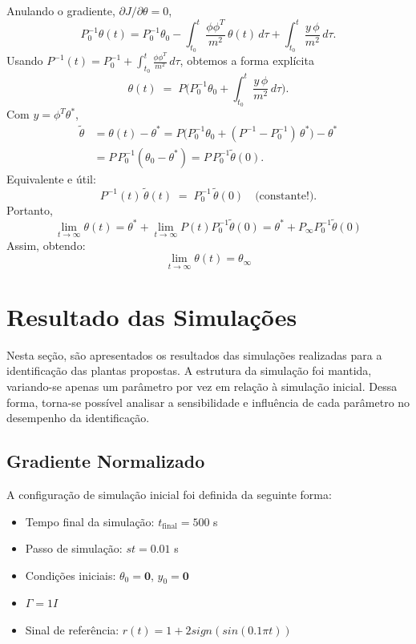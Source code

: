 \documentclass[10pt]{article}
\begin{document}
Anulando o gradiente, \(\partial J/\partial\theta=0\),
\[
P_0^{-1}\theta(t)
= P_0^{-1}\theta_0
- \int_{t_0}^{t}\!\frac{\phi\phi^T}{m^2}\,\theta(t)\,d\tau
+ \int_{t_0}^{t}\!\frac{y\,\phi}{m^2}\,d\tau.
\]
Usando
\(
P^{-1}(t)=P_0^{-1}+\int_{t_0}^t \frac{\phi\phi^T}{m^2}\,d\tau
\),
obtemos a forma explícita
\[
\theta(t) \;=\; P\Big(P_0^{-1}\theta_0
+ \int_{t_0}^{t}\!\frac{y\,\phi}{m^2}\,d\tau\Big).
\]
Com \(y=\phi^T\theta^\ast\),
\begin{align*}
\tilde\theta
&= \theta(t)-\theta^\ast
= P\Big(P_0^{-1}\theta_0 + (P^{-1}-P_0^{-1})\,\theta^\ast\Big) - \theta^\ast\\
&= P\,P_0^{-1}(\theta_0-\theta^\ast)
= P\,P_0^{-1}\tilde\theta(0).
\end{align*}
Equivalente e útil:
\[
P^{-1}(t)\,\tilde\theta(t) \;=\; P_0^{-1}\,\tilde\theta(0)\quad\text{(constante!)}.
\]
Portanto,  
\[
\lim_{t \to \infty} \theta(t) = \theta^{*} + \lim_{t \to \infty} P(t) P_{0}^{-1} \tilde{\theta}(0) =\theta^{*} + P_{\infty} P_{0}^{-1} \tilde{\theta}(0)
\]
Assim, obtendo:
\[
\lim_{t \to \infty} \theta(t) = \theta_{\infty}
\]

\newpage

\section{Resultado das Simulações}

Nesta seção, são apresentados os resultados das simulações realizadas para a identificação das plantas propostas.
A estrutura da simulação foi mantida, variando-se apenas um parâmetro por vez em relação à simulação inicial.
Dessa forma, torna-se possível analisar a sensibilidade e influência de cada parâmetro no desempenho da identificação.

\subsection{Gradiente Normalizado}

A configuração de simulação inicial foi definida da seguinte forma:

\begin{itemize}
    \item Tempo final da simulação: $t_{\text{final}} = 500$ s
    \item Passo de simulação: $st = 0.01$ s
    \item Condições iniciais: $\theta_0 = \mathbf{0}$, $y_0 = \mathbf{0}$
    \item $\Gamma = 1I$
    \item Sinal de referência: $r(t) =  1 + 2sign(sin(0.1 \pi t))$
\end{itemize}
\end{document}
